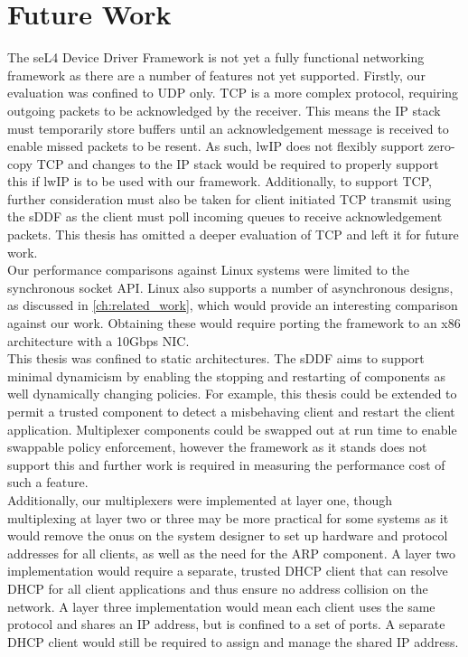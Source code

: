 \section{Future Work}

The seL4 Device Driver Framework is not yet a fully functional networking framework as there are a number of features
not yet supported.
Firstly, our evaluation was confined to UDP only. TCP is a more complex protocol, requiring outgoing packets to be acknowledged 
by the receiver. This means the IP stack must temporarily store buffers until an acknowledgement message is received to enable missed packets 
to be resent. As such, lwIP does not flexibly support zero-copy TCP and changes to the IP stack would be required to properly
support this if lwIP is to be used with our framework. Additionally, to support TCP, further consideration must also be taken
for client initiated TCP transmit using the sDDF as the client must poll incoming queues to receive acknowledgement packets. 
This thesis has omitted a deeper evaluation of TCP and left it for future work. \\

Our performance comparisons against Linux systems were limited to the synchronous socket API. Linux also supports a number
of asynchronous designs, as discussed in \autoref{ch:related_work}, which would provide an interesting comparison against 
our work. Obtaining these would require porting the framework to an x86 architecture with a 10Gbps NIC. \\

This thesis was confined to static architectures. The sDDF aims to support minimal dynamicism by enabling the stopping and restarting
of components as well dynamically changing policies. For example, this thesis could be extended to permit a trusted component
to detect a misbehaving client and restart the client application. Multiplexer components could be swapped out at run time to enable
swappable policy enforcement, however the framework as it stands does not support this and further work is required in measuring 
the performance cost of such a feature. \\

Additionally, our multiplexers were implemented at layer one, though multiplexing at layer two or three may be more practical for some
systems as it would remove the onus on the system designer to set up hardware and protocol addresses for all clients, as well as the 
need for the ARP component. A layer two implementation would require a separate, trusted DHCP client that can resolve DHCP for all
client applications and thus ensure no address collision on the network. A layer three implementation would mean each client uses the 
same protocol and shares an IP address, but is confined to a set of ports. A separate DHCP client would still be required to assign
and manage the shared IP address. \\

